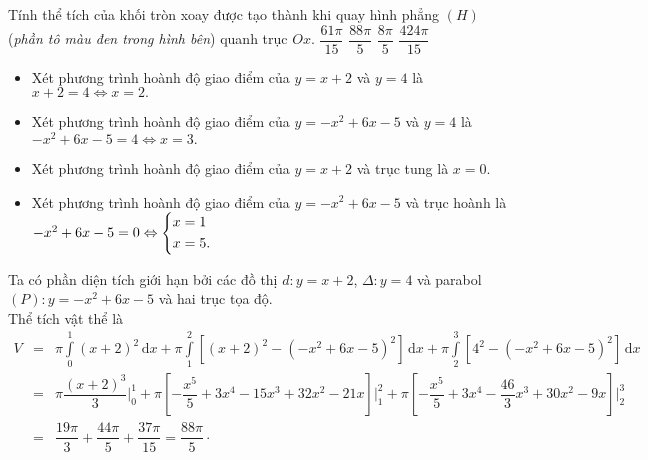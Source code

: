 \begin{ex}%
\immini
{Tính thể tích của khối tròn xoay được tạo thành khi quay hình phẳng $ (H) $	(\textit{phần tô màu đen trong hình bên}) quanh trục $ Ox. $
	\choice
	{$ \dfrac{61\pi}{15} $}
	{\True $ \dfrac{88\pi}{5} $}
	{ $ \dfrac{8\pi}{5} $}
	{$ \dfrac{424\pi}{15} $}
}
{ }
	\loigiai
	{\begin{itemize}
			\item Xét phương trình hoành độ giao điểm của $ y=x+2 $ và $ y=4 $ là $ x+2=4 \Leftrightarrow x = 2.$
			\item Xét phương trình hoành độ giao điểm của $ y=-x^2+6x-5 $ và $ y=4 $ là $ -x^2+6x-5=4 \Leftrightarrow x=3. $
			\item Xét phương trình hoành độ giao điểm của $ y=x+2 $ và trục tung là $ x=0.$
			\item Xét phương trình hoành độ giao điểm của $ y=-x^2+6x-5 $ và trục hoành là $ -x^2+6x-5=0 \Leftrightarrow \left\{\begin{aligned}&x=1\\&x=5.\end{aligned}\right. $
		\end{itemize}
		Ta có phần diện tích giới hạn bởi các đồ thị $ d\colon y=x+2 $, $ \Delta\colon y=4 $ và parabol $ (P)\colon y=-x^2+6x-5 $ và hai trục tọa độ.\\
		Thể tích vật thể là 
		\begin{eqnarray*}
V& =& \pi \displaystyle \int\limits_{0}^{1} (x+2)^2 \mathrm{\,d}x + \pi \int\limits_{1}^{2} \left[(x+2)^2-(-x^2+6x-5)^2\right]\mathrm{\,d}x+\pi \int\limits_{2}^{3} \left[4^2 - (-x^2+6x-5)^2\right]\mathrm{\,d}x\\
&=& \pi \dfrac{\left(x+2\right)^3}{3}\bigg|_0^1+\pi \left[-\dfrac{x^5}{5} +3x^4-15x^3+32x^2-21x\right]\bigg|_1^2+\pi \left[-\dfrac{x^5}{5}+3x^4-\dfrac{46}{3}x^3+30x^2-9x\right]\bigg|_2^3\\
&=& \dfrac{19\pi}{3}+\dfrac{44\pi}{5}+\dfrac{37\pi}{15} = \dfrac{88\pi}{5}\cdot
		\end{eqnarray*}	}
\end{ex}
